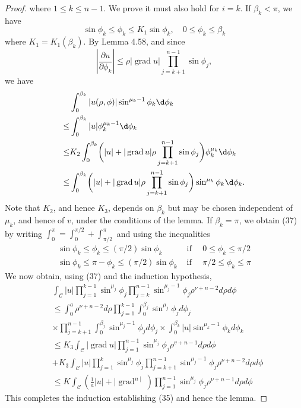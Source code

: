 \begin{proof}
  where $1 \leq k \leq n-1$. We prove it must also hold for $i=k$.
  If $\beta_k<\pi$, we have
  \[
  \sin \phi_k \leq \phi_k \leq K_1 \sin \phi_k, \quad 0 \leq \phi_k \leq \beta_k
  \]
  where $K_1=K_1\left(\beta_k\right)$. By Lemma 4.58, and since
  \[
  \left|\frac{\partial u}{\partial \phi_k}\right| \leq \rho|\operatorname{grad} u| \prod_{j=k+1}^{n-1} \sin \phi_j,
  \]
  we have
  \begin{align*}
    & \int_0^{\beta_k} |u(\rho,\phi)| \sin^{\mu_k-1} \phi_k \d \phi_k \\
    \leq & \int_0^{\beta_k} |u| \phi_k^{\mu_k-1} \d \phi_k \\
    \leq & K_2 \int_0^{\beta_k} \biggl(|u| 
      + |\grad u| \rho \prod_{j=k+1}^{n-1} \sin\phi_j\biggr) \phi_k^{\mu_k} \d \phi_k \\
    \leq & \int_{0}^{\beta_k} \biggl(|u| 
      + |\grad u| \rho \prod_{j=k+1}^{n-1} \sin\phi_j\biggr) \sin^{\mu_k} \phi_k \d \phi_k.
  \end{align*}
  Note that $K_2$, and hence $K_3$, depends on $\beta_k$ but may be chosen independent of $\mu_k$, and hence of $v$, under the conditions of the lemma. If $\beta_k=\pi$, we obtain (37) by writing $\int_0^\pi=\int_0^{\pi / 2}+\int_{\pi / 2}^\pi$ and using the inequalities
  \[
  \begin{array}{ll}
  \sin \phi_k \leq \phi_k \leq(\pi / 2) \sin \phi_k & \text { if } \quad 0 \leq \phi_k \leq \pi / 2 \\
  \sin \phi_k \leq \pi-\phi_k \leq(\pi / 2) \sin \phi_k & \text { if } \quad \pi / 2 \leq \phi_k \leq \pi
  \end{array}
  \]
  We now obtain, using (37) and the induction hypothesis,
  \[
  \begin{aligned}
  & \int_{\mathcal{C}}|u| \prod_{j=1}^{k-1} \sin ^{\mu_j} \phi_j \prod_{j=k}^{n-1} \sin ^{\mu_j-1} \phi_j \rho^{\nu+n-2} d \rho d \phi \\
  & \leq \int_0^a \rho^{\nu+n-2} d \rho \prod_{j=1}^{k-1} \int_0^{\beta_j} \sin ^{\mu_j} \phi_j d \phi_j \\
  & \times \prod_{j=k+1}^{n-1} \int_0^{\beta_j} \sin ^{\mu_j-1} \phi_j d \phi_j \times \int_0^{\beta_k}|u| \sin ^{\mu_k-1} \phi_k d \phi_k \\
  & \leq K_3 \int_{\mathcal{C}}|\operatorname{grad} u| \prod_{j=1}^{n-1} \sin ^{\mu_j} \phi_j \rho^{v+n-1} d \rho d \phi \\
  &+K_3 \int_{\mathcal{C}}|u| \prod_{j=1}^k \sin ^{\mu_j} \phi_j \prod_{j=k+1}^{n-1} \sin ^{\mu_j-1} \phi_j \rho^{\nu+n-2} d \rho d \phi \\
  & \leq K \int_{\mathcal{C}}\left(\frac{1}{a}|u|+\mid \operatorname{grad}^{n \mid}\right) \prod_{j=1}^{n-1} \sin ^{\mu_j} \phi_j \rho^{\nu+n-1} d \rho d \phi
  \end{aligned}
  \]
  This completes the induction establishing (35) and hence the lemma.
\end{proof}


